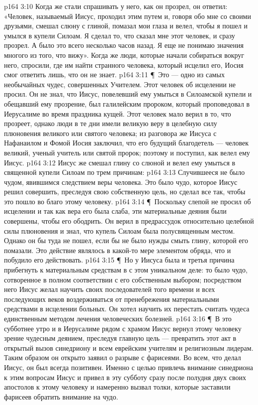 \vs p164 3:10 Когда же стали спрашивать у него, как он прозрел, он ответил: «Человек, называемый Иисус, проходил этим путем и, говоря обо мне со своими друзьями, смешал слюну с глиной, помазал мои глаза и велел, чтобы я пошел и умылся в купели Силоам. Я сделал то, что сказал мне этот человек, и сразу прозрел. А было это всего несколько часов назад. Я еще не понимаю значения многого из того, что вижу». Когда же люди, которые начали собираться вокруг него, спросили, где им найти странного человека, который исцелил его, Иосия смог ответить лишь, что он не знает.
\vs p164 3:11 \P\ Это --- одно из самых необычайных чудес, совершенных Учителем. Этот человек об исцелении не просил. Он не знал, что Иисус, повелевший ему умыться в Силоамской купели и обещавший ему прозрение, был галилейским пророком, который проповедовал в Иерусалиме во время праздника кущей. Этот человек мало верил в то, что прозреет, однако люди в те дни имели великую веру в целебную силу плюновения великого или святого человека; из разговора же Иисуса с Нафанаилом и Фомой Иосия заключил, что его будущий благодетель --- человек великий, ученый учитель или святой пророк; поэтому и поступил, как велел ему Иисус.
\vs p164 3:12 Иисус же смешал глину со слюной и велел ему умыться в священной купели Силоам по трем причинам:
\vs p164 3:13 \bibnobreakspace Случившееся не было чудом, явившимся следствием веры человека. Это было чудо, которое Иисус решил совершить, преследуя свою собственную цель, но сделал все так, чтобы это пошло во благо этому человеку.
\vs p164 3:14 \P\ \bibnobreakspace Поскольку слепой не просил об исцелении и так как вера его была слаба, эти материальные деяния были совершены, чтобы его ободрить. Он верил в предрассудок относительно целебной силы плюновения и знал, что купель Силоам была полусвященным местом. Однако он бы туда не пошел, если бы не было нужды смыть глину, которой его помазали. Это действие являлось в какой\hyp{}то мере элементом обряда, что и побудило его действовать.
\vs p164 3:15 \P\ \bibnobreakspace Но у Иисуса была и третья причина прибегнуть к материальным средствам в с этом уникальном деле: то было чудо, сотворенное в полном соответствии с его собственным выбором; посредством него Иисус желал научить своих последователей того времени и всех последующих веков воздерживаться от пренебрежения материальными средствами в исцелении больных. Он хотел научить их перестать считать чудеса единственным методом лечения человеческих болезней.
\vs p164 3:16 \P\ В это субботнее утро и в Иерусалиме рядом с храмом Иисус вернул этому человеку зрение чудесным деянием, преследуя главную цель --- превратить этот акт в открытый вызов синедриону и всем еврейским учителям и религиозным лидерам. Таким образом он открыто заявил о разрыве с фарисеями. Во всем, что делал Иисус, он был всегда позитивен. Именно с целью привлечь внимание синедриона к этим вопросам Иисус и привел в эту субботу сразу после полудня двух своих апостолов к этому человеку и намеренно вызвал толки, которые заставили фарисеев обратить внимание на чудо.
